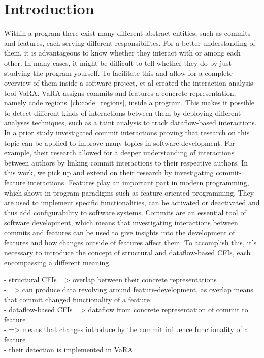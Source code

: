 \section*{Introduction}\label{ch:introduction}

Within a program there exist many different abstract entities, such as commits and features, each serving different responsibilites.
For a better understanding of them, it is advantageous to know whether they interact with or among each other.
In many cases, it might be difficult to tell whether they do by just studying the program yourself.
To facilitate this and allow for a complete overview of them inside a software project, \citet{sattler2023thesis} et al created the interaction analysis tool VaRA.
VaRA assigns commits and features a concrete representation, namely code regions~\ref{ch:code_regions}, inside a program.
This makes it possible to detect different kinds of interactions between them by deploying different analyses techniques, such as a taint analysis to track dataflow-based interactions.
In a prior study \citet{sattler2023seal} investigated commit interactions proving that research on this topic can be applied to improve many topics in software development.
For example, their research allowed for a deeper understanding of interactions between authors by linking commit interactions to their respective authors.
In this work, we pick up and extend on their research by investigating commit-feature interactions.
Features play an important part in modern programming, which shows in program paradigms such as feature-oriented programming.
They are used to implement specific functionalities, can be activated or deactivated and thus add configurability to software systems.
Commits are an essential tool of software development, which means that investigating interactions between commits and features can be used to give insights into the development of features and how changes outside of features affect them.
To accomplish this, it's necessary to introduce the concept of structural and dataflow-based CFIs, each encompassing a different meaning.

- structural CFIs => overlap between their concrete representations \\
- => can produce data revolving around feature-development, as overlap means that commit changed functionality of a feature \\
- dataflow-based CFIs => dataflow from concrete representation of commit to feature \\
- => means that changes introduce by the commit influence functionality of a feature \\
- their detection is implemented in VaRA \\

